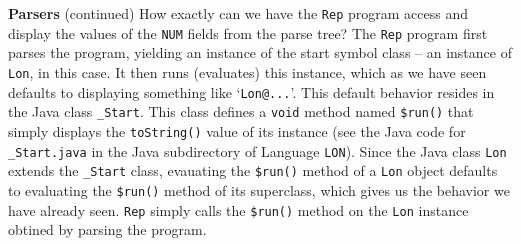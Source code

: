 \begin{minipage}[t]{\sw}
\slidenumber
\LARGE
{\bf Parsers} (continued)\exx
\emm\LightBox{\MYlonGrammarKleene}\exx
How exactly can we have the \verb'Rep' program access and display
the values of the \verb'NUM' fields from the parse tree?
The \verb'Rep' program first parses the program,
yielding an instance of the start symbol class
-- an instance of \verb'Lon', in this case.
It then runs (evaluates) this instance,
which as we have seen defaults
to displaying something like `\verb'Lon@...''.\exx
This default behavior resides in the Java class \verb'_Start'.
This class defines a \verb'void' method named \verb'$run()'
that simply displays the \verb'toString()' value of its instance
(see the Java code for \verb'_Start.java'
in the Java subdirectory of Language \verb'LON').
Since the Java class \verb'Lon' extends the \verb'_Start' class,
evauating the \verb'$run()' method of a \verb'Lon' object
defaults to evaluating the \verb'$run()' method of its superclass,
which gives us the behavior we have already seen.
\verb'Rep' simply calls the \verb'$run()' method
on the \verb'Lon' instance obtined by parsing the program.
\end{minipage}
\clearpage
